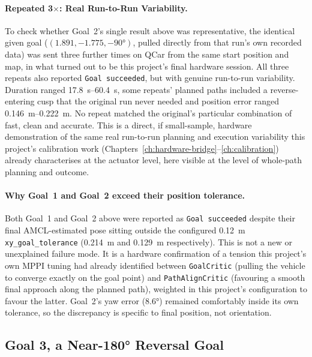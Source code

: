 \paragraph{Repeated 3$\times$: Real Run-to-Run Variability.}
To check whether Goal~2's single result above was representative, the
identical given goal ($(1.891, -1.775, \ang{-90})$, pulled directly
from that run's own recorded data) was sent three further times on
QCar from the same start position and map, in what turned
out to be this project's final hardware session. All three repeats
also reported \texttt{Goal succeeded}, but with genuine run-to-run
variability. Duration ranged \SIrange{17.8}{60.4}{\second}, some
repeats' planned paths included a reverse-entering cusp that the
original run never needed and position error ranged
\SIrange{0.146}{0.222}{\meter}. No repeat matched the original's
particular combination of fast, clean and accurate. This is a direct,
if small-sample, hardware demonstration of the same real run-to-run
planning and execution variability this project's calibration work
(Chapters~\ref{ch:hardware-bridge}--\ref{ch:calibration}) already
characterises at the actuator level, here visible at the level of
whole-path planning and outcome.

\paragraph{Why Goal~1 and Goal~2 exceed their position tolerance.}
Both Goal~1 and Goal~2 above were reported as \texttt{Goal succeeded}
despite their final AMCL-estimated pose sitting outside the configured
\SI{0.12}{\meter} \texttt{xy\_goal\_tolerance} (\SI{0.214}{\meter} and
\SI{0.129}{\meter} respectively). This is not a new or unexplained
failure mode. It is a hardware confirmation of a tension this
project's own MPPI tuning had already identified between
\texttt{GoalCritic} (pulling the vehicle to converge exactly on the
goal point) and \texttt{PathAlignCritic} (favouring a smooth final
approach along the planned path), weighted in this project's
configuration to favour the latter.
Goal~2's yaw error (\ang{8.6}) remained comfortably inside its own
tolerance, so the discrepancy is specific to final position, not
orientation.

\subsection{Goal 3, a Near-\ang{180} Reversal Goal}
\label{sec:goal3-reversal}

